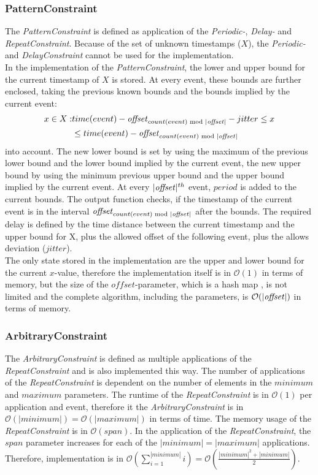 \subsubsection{PatternConstraint}
	The \emph{PatternConstraint} is defined as application of the \emph{Periodic-}, \emph{Delay-} and \emph{RepeatConstraint}. Because of the set of unknown timestamps ($X$), the \emph{Periodic-} and \emph{DelayConstraint} cannot be used for the implementation.\\
	In the implementation of the \emph{PatternConstraint}, the lower and upper bound for the current timestamp of $X$ is stored. At every event, these bounds are further enclosed, taking the previous known bounds and the bounds implied by the current event:
	\begin{align}
		x\in X: &time(event)-\text{\emph{offset}}_{count(event)\text{ mod }|\text{\emph{offset}}|}-jitter \leq x\\
			     &\leq  time(event)-\text{\emph{offset}}_{count(event)\text{ mod }|\text{\emph{offset}}|}
	\end{align}
	into account. The new lower bound is set by using the maximum of the previous lower bound and the lower bound implied by the current event, the new upper bound by using the minimum previous upper bound and the upper bound implied by the current event. At every $|\text{\emph{offset}}|^{th}$ event, $period$ is added to the current bounds. The output function checks, if the timestamp of the current event is in the interval $\text{\emph{offset}}_{count(event)\text{ mod }|\text{\emph{offset}}|}$ after the bounds. The required delay is defined by the time distance between the current timestamp and the upper bound for X, plus the allowed offset of the following event, plus the allows deviation ($jitter$).\\
	The only state stored in the implementation are the upper and lower bound for the  current $x$-value, therefore the implementation itself is in $\mathcal{O}(1)$ in terms of memory, but the size of the $offset$-parameter, which is a hash map%
	, is not limited and the complete algorithm, including the parameters, is $\mathcal{O}(|\text{\emph{offset}}|)$ in terms of memory.
	
\subsubsection{ArbitraryConstraint}
	The \emph{ArbitraryConstraint} is defined as multiple applications of the \emph{RepeatConstraint} and is also implemented this way. The number of applications of the \emph{RepeatConstraint} is dependent on the number of elements in the $minimum$ and $maximum$ parameters. The runtime of the \emph{RepeatConstraint} is in $\mathcal{O}(1)$ per application and event, therefore it the \emph{ArbitraryConstraint} is in $\mathcal{O}(|minimum|) = \mathcal{O}(|maximum|)$ in terms of time. The memory usage of the \emph{RepeatConstraint} is in $\mathcal{O}(span)$. In the application of the \emph{RepeatConstraint}, the $span$ parameter increases for each of the $|minimum| = |maximum|$ applications. Therefore, implementation is in $\mathcal{O}(\sum_{i=1}^{|minimum|}i)=\mathcal{O}(\frac{|minimum|^2+|minimum|}{2})$.

